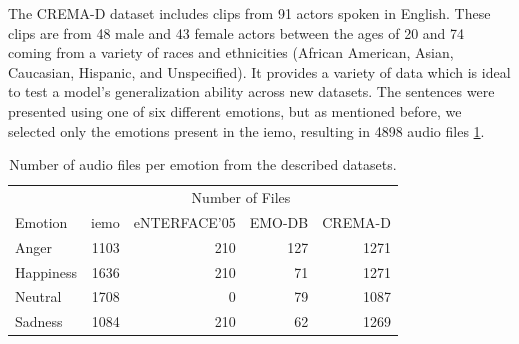 The CREMA-D dataset includes clips from 91 actors spoken in English. These clips are from 48 male and 43 female actors between the ages of 20 and 74 coming from a variety of races and ethnicities (African American, Asian, Caucasian, Hispanic, and Unspecified). It provides a variety of data which is ideal to test a model's generalization ability across new datasets. The sentences were presented using one of six different emotions, but as mentioned before, we selected only the emotions present in the \ac{iemo}, resulting in 4898 audio files \ref{tab:all_datasets}. 


\begin{table}[H]
	\centering
	\caption{Number of audio files per emotion from the described datasets.}
	\label{tab:all_datasets}
	\begin{tabular}{lrrrr}
		\toprule
		& \multicolumn{4}{c}{Number of Files} \\
		Emotion     &   \ac{iemo} & eNTERFACE'05 & EMO-DB & CREMA-D \\
		\midrule
		Anger   	&         1103 &  210 & 127 & 1271 \\
		Happiness   &         1636 &  210 &  71 & 1271 \\
		Neutral		&         1708 &    0 &  79 & 1087 \\
		Sadness     &         1084 &  210 &  62 & 1269 \\
		\bottomrule
	\end{tabular}
\end{table}


